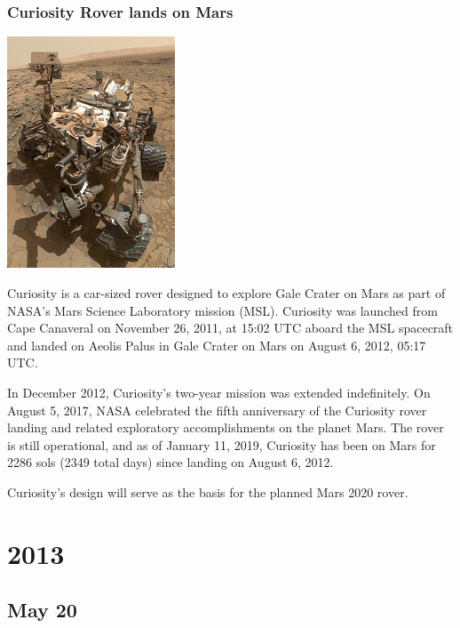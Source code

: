 \documentclass[11pt]{report}
\begin{document}
\subsection{Curiosity Rover lands on Mars}
\vspace{2mm}\begin{center}\includegraphics[width=5cm]{./img/curiosityRover.jpg}\end{center}
Curiosity is a car-sized rover designed to explore Gale Crater on Mars as part of NASA's Mars Science Laboratory mission (MSL). Curiosity was launched from Cape Canaveral on November 26, 2011, at 15:02 UTC aboard the MSL spacecraft and landed on Aeolis Palus in Gale Crater on Mars on August 6, 2012, 05:17 UTC.

In December 2012, Curiosity's two-year mission was extended indefinitely. On August 5, 2017, NASA celebrated the fifth anniversary of the Curiosity rover landing and related exploratory accomplishments on the planet Mars. The rover is still operational, and as of January 11, 2019, Curiosity has been on Mars for 2286 sols (2349 total days) since landing on August 6, 2012.

Curiosity's design will serve as the basis for the planned Mars 2020 rover.


\chapter{2013}
\section{May 20}
\end{document}
